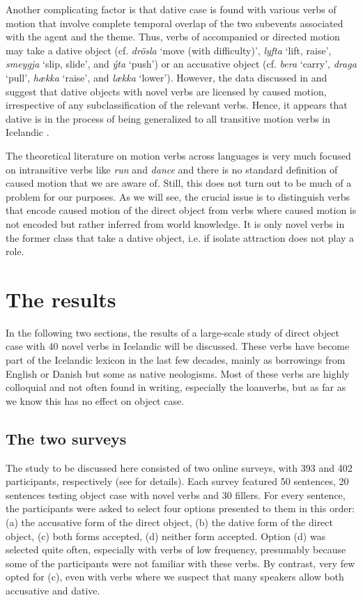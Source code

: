 \documentclass[output=paper,modfonts,nonflat,colorlinks,citecolor=brown]{langsci/langscibook}
\begin{document}
Another complicating factor is that dative case is found with various verbs of motion that involve complete temporal overlap of the two subevents associated with the agent and the theme. Thus, verbs of accompanied or directed motion may take a dative object (cf. \textit{drösla} ‘move (with difficulty)’, \textit{lyfta} ‘lift, raise’, \textit{smeygja} ‘slip, slide’, and \textit{ýta} ‘push’) or an accusative object (cf. \textit{bera} ‘carry’, \textit{draga} ‘pull’, \textit{hækka} ‘raise’, and \textit{lækka} ‘lower’). However, the data discussed in  and  suggest that dative objects with novel verbs are licensed by caused motion, irrespective of any subclassification of the relevant verbs. Hence, it appears that dative is in the process of being generalized to all transitive motion verbs in Icelandic \citep{Barðdal2008}.

The theoretical literature on motion verbs across languages is very much focused on intransitive verbs like \textit{run} and \textit{dance} and there is no standard definition of caused motion that we are aware of. Still, this does not turn out to be much of a problem for our purposes. As we will see, the crucial issue is to distinguish verbs that encode caused motion of the direct object from verbs where caused motion is not encoded but rather inferred from world knowledge. It is only novel verbs in the former class that take a dative object, i.e. if isolate attraction does not play a role.

\section{The results} %
\label{sec:jonsson:3}

In the following two sections, the results of a large-scale study of direct object case with 40 novel verbs in Icelandic will be discussed. These verbs have become part of the Icelandic lexicon in the last few decades, mainly as borrowings from English or Danish but some as native neologisms. Most of these verbs are highly colloquial and not often found in writing, especially the loanverbs, but as far as we know this has no effect on object case.

\subsection{The two surveys} %
\label{sec:jonsson:3.1}

The study to be discussed here consisted of two online surveys, with 393 and 402 participants, respectively (see \citealt{Thórarinsdóttir2015} for details). Each survey featured 50 sentences, 20 sentences testing object case with novel verbs and 30 fillers. For every sentence, the participants were asked to select four options presented to them in this order: (a) the accusative form of the direct object, (b) the dative form of the direct object, (c) both forms accepted, (d) neither form accepted. Option (d) was selected quite often, especially with verbs of low frequency, presumably because some of the participants were not familiar with these verbs. By contrast, very few opted for (c), even with verbs where we suspect that many speakers allow both accusative and dative.
\end{document}
